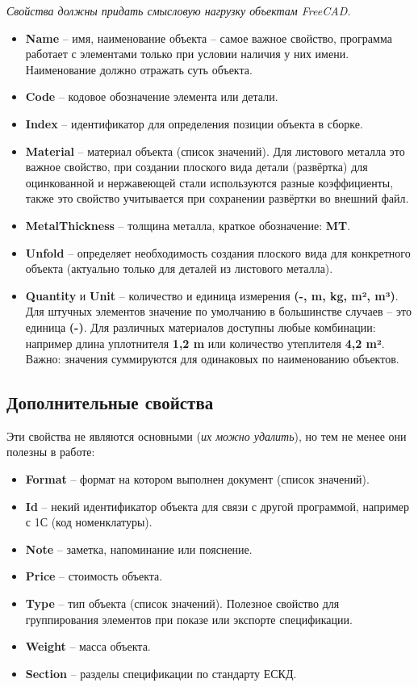 \documentclass[a4paper,12pt]{article}
\begin{document}
\begin{center}\emph{Свойства должны придать смысловую нагрузку объектам FreeCAD.}\end{center}

\begin{itemize}
	\item \textbf{Name} -- имя, наименование объекта -- самое важное свойство, программа работает с элементами только при условии наличия у них имени. Наименование должно отражать суть объекта.
	\item \textbf{Code} -- кодовое обозначение элемента или детали.
	\item \textbf{Index} -- идентификатор для определения позиции объекта в сборке.
	\item \textbf{Material} -- материал объекта (список значений). Для листового металла это важное свойство, при создании плоского вида детали (развёртка) для оцинкованной и нержавеющей стали используются разные коэффициенты, также это свойство учитывается при сохранении развёртки во внешний файл.
	\item \textbf{MetalThickness} -- толщина металла, краткое обозначение: \textbf{MT}.
	\item \textbf{Unfold} -- определяет необходимость создания плоского вида для конкретного объекта (актуально только для деталей из листового металла).
	\item \textbf{Quantity} и \textbf{Unit} -- количество и единица измерения \textbf{(-, m, kg, m², m³)}. Для штучных элементов значение по умолчанию в большинстве случаев -- это единица \textbf{(-)}. Для различных материалов доступны любые комбинации: например длина уплотнителя \textbf{1,2 m} или количество утеплителя \textbf{4,2 m²}. Важно: значения суммируются для одинаковых по наименованию объектов.
\end{itemize}


\subsection{Дополнительные свойства}

Эти свойства не являются основными (\emph{их можно удалить}), но тем не менее они полезны в работе:
\begin{itemize}
	\item \textbf{Format} -- формат на котором выполнен документ (список значений).
	\item \textbf{Id} -- некий идентификатор объекта для связи с другой программой, например с 1С (код номенклатуры).
	\item \textbf{Note} -- заметка, напоминание или пояснение.
	\item \textbf{Price} -- стоимость объекта.
	\item \textbf{Type} -- тип объекта (список значений). Полезное свойство для группирования элементов при показе или экспорте спецификации.
	\item \textbf{Weight} -- масса объекта.
	\item \textbf{Section} -- разделы спецификации по стандарту ЕСКД.
\end{itemize}
\end{document}
